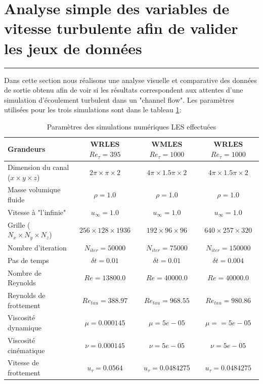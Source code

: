 \documentclass[12pt]{article}
\theoremstyle{plain}
\theoremstyle{remark}
\begin{document}
\vspace{0.3cm}
\section{Analyse simple des variables de vitesse turbulente afin de valider les jeux de données}
\noindent\rule{\linewidth}{2pt}
\vspace{0.1cm}

Dans cette section nous réalisons une analyse visuelle et comparative des données de sortie obtenu afin de voir si les résultats correspondent aux attentes d'une simulation d'écoulement turbulent dans un "channel flow". Les paramètres utilisées pour les trois simulations sont dans le tableau \ref{tab:parameters}: \\

\begin{table}[!h]
	\begin{tabular}{l | c | c | c}

		Grandeurs & WRLES $Re_{\tau}=395$ & WMLES $Re_{\tau}=1000$ & WRLES $Re_{\tau}=1000$\\ \hline \hline
		Dimension du canal ($x\times y \times z$) &  $2\pi\times\pi\times2$ & $4\pi\times1.5\pi\times2$ & $4\pi\times1.5\pi\times2$\\
		Masse volumique fluide &  $\rho = 1.0$ & $\rho = 1.0$ & $\rho = 1.0$ \\
		Vitesse à "l'infinie" & $u_{\infty}=1.0$ & $u_{\infty}=1.0$ & $u_{\infty}=1.0$  \\
		Grille ($N_x\times N_y \times N_z$) & $256\times128\times1936$ & $192\times96\times96$ & $640\times257\times320$ \\
		Nombre d'iteration & $N_{iter}=50000$ & $N_{iter}=75000$ & $N_{iter}=150000$ \\
		Pas de temps & $\delta t=0.01$ & $\delta t=0.01$ & $\delta t=0.004$ \\
		Nombre de Reynolds & $Re = 13800.0$ & $Re = 40000.0$ & $Re = 40000.0$ \\
		Reynolds de frottement & $Re_{tau} = 388.97$ & $Re_{tau} = 968.55$ & $Re_{tau} = 980.86$ \\
		Viscosité dynamique& $\mu = 0.000145$ & $\mu = 5e-05$ & $\mu = = 5e-05$ \\
		Viscosité cinématique & $\nu = 0.000145$ & $\nu = 5e-05$ & $\nu = 5e-05$ \\
		Vitesse de frottement & $u_{\tau} = 0.0564$ & $u_{\tau} = 0.0484275$ & $u_{\tau} = 0.0484275$ \\
		\hline
	\end{tabular}
	\caption{Paramètres des simulations numériques LES effectuées}
	\label{tab:parameters}
\end{table}
\end{document}
